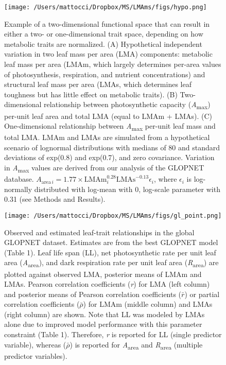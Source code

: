 \documentclass[
  12pt,
  a4paper,
,tablecaptionabove
]{scrartcl}
\begin{document}
\newpage

\begin{figure}

{\centering \texttt{[image: /Users/mattocci/Dropbox/MS/LMAms/figs/hypo.png]}

}

\caption{\label{fig-Hplt}Example of a two-dimensional functional space
that can result in either a two- or one-dimensional trait space,
depending on how metabolic traits are normalized. (A) Hypothetical
independent variation in two leaf mass per area (LMA) components:
metabolic leaf mass per area (LMAm, which largely determines per-area
values of photosynthesis, respiration, and nutrient concentrations) and
structural leaf mass per area (LMAs, which determines leaf toughness but
has little effect on metabolic traits). (B) Two-dimensional relationship
between photosynthetic capacity (\emph{A}\textsubscript{max}) per-unit
leaf area and total LMA (equal to LMAm + LMAs). (C) One-dimensional
relationship between \emph{A}\textsubscript{max} per-unit leaf mass and
total LMA. LMAm and LMAs are simulated from a hypothetical scenario of
lognormal distributions with medians of 80 and standard deviations of
exp(0.8) and exp(0.7), and zero covariance. Variation in
\emph{A}\textsubscript{max} values are derived from our analysis of the
GLOPNET database.
\(A_{\mathrm{area} \, i}=1.77 \times \mathrm{LMAm}_i^{0.28}\mathrm{LMAs}^{-0.13}\epsilon_i\),
where \(\epsilon_i\) is log-normally distributed with log-mean with 0,
log-scale parameter with 0.31 (see Methods and Results).}

\end{figure}

\begin{figure}

{\centering \texttt{[image: /Users/mattocci/Dropbox/MS/LMAms/figs/gl\_point.png]}

}

\caption{\label{fig-GLplt}Observed and estimated leaf-trait
relationships in the global GLOPNET dataset. Estimates are from the best
GLOPNET model (Table 1). Leaf life span (LL), net photosynthetic rate
per unit leaf area (\emph{A}\textsubscript{area}), and dark respiration
rate per unit leaf area (\emph{R}\textsubscript{area}) are plotted
against observed LMA, posterior means of LMAm and LMAs. Pearson
correlation coefficients (\emph{r}) for LMA (left column) and posterior
means of Pearson correlation coefficients (\(\bar{r}\)) or partial
correlation coefficients (\(\bar{\rho}\)) for LMAm (middle column) and
LMAs (right column) are shown. Note that LL was modeled by LMAs alone
due to improved model performance with this parameter constraint (Table
1). Therefore, \emph{r} is reported for LL (single predictor variable),
whereas (\(\bar{\rho}\)) is reported for \emph{A}\textsubscript{area}
and \emph{R}\textsubscript{area} (multiple predictor variables).}

\end{figure}
\end{document}
